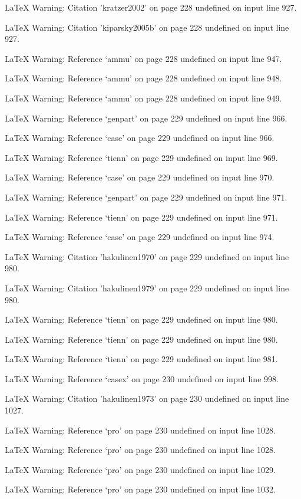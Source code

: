 LaTeX Warning: Citation 'kratzer2002' on page 228 undefined on input line 927.


LaTeX Warning: Citation 'kiparsky2005b' on page 228 undefined on input line 927.


LaTeX Warning: Reference `ammu' on page 228 undefined on input line 947.


LaTeX Warning: Reference `ammu' on page 228 undefined on input line 948.


LaTeX Warning: Reference `ammu' on page 228 undefined on input line 949.


LaTeX Warning: Reference `genpart' on page 229 undefined on input line 966.


LaTeX Warning: Reference `case' on page 229 undefined on input line 966.


LaTeX Warning: Reference `tienn' on page 229 undefined on input line 969.


LaTeX Warning: Reference `case' on page 229 undefined on input line 970.


LaTeX Warning: Reference `genpart' on page 229 undefined on input line 971.


LaTeX Warning: Reference `tienn' on page 229 undefined on input line 971.


LaTeX Warning: Reference `case' on page 229 undefined on input line 974.


LaTeX Warning: Citation 'hakulinen1970' on page 229 undefined on input line 980.


LaTeX Warning: Citation 'hakulinen1979' on page 229 undefined on input line 980.


LaTeX Warning: Reference `tienn' on page 229 undefined on input line 980.


LaTeX Warning: Reference `tienn' on page 229 undefined on input line 980.


LaTeX Warning: Reference `tienn' on page 229 undefined on input line 981.


LaTeX Warning: Reference `casex' on page 230 undefined on input line 998.


LaTeX Warning: Citation 'hakulinen1973' on page 230 undefined on input line 1027.


LaTeX Warning: Reference `pro' on page 230 undefined on input line 1028.


LaTeX Warning: Reference `pro' on page 230 undefined on input line 1028.


LaTeX Warning: Reference `pro' on page 230 undefined on input line 1029.


LaTeX Warning: Reference `pro' on page 230 undefined on input line 1032.


